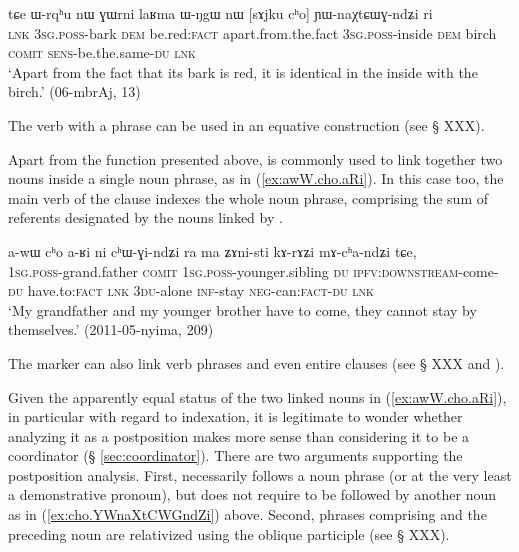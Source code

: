 \begin{exe}
\ex \label{ex:cho.YWnaXtCWGndZi}
\gll tɕe ɯ-rqʰu nɯ ɣɯrni laʁma ɯ-ŋgɯ nɯ [sɤjku cʰo] ɲɯ-naχtɕɯɣ-ndʑi ri\\
\textsc{lnk} \textsc{3sg}.\textsc{poss}-bark \textsc{dem} be.red:\textsc{fact} apart.from.the.fact \textsc{3sg}.\textsc{poss}-inside \textsc{dem} birch \textsc{comit} \textsc{sens}-be.the.same-\textsc{du} \textsc{lnk} \\
\glt `Apart from the fact that its bark is red, it is identical in the inside with the birch.' (06-mbrAj, 13)
\end{exe}

The verb  with a  phrase can be used in an equative construction (see § XXX).

 Apart from the function presented above,  is commonly used to link together two nouns inside a single noun phrase, as in (\ref{ex:awW.cho.aRi}). In this case too, the main verb of the clause indexes the whole noun phrase, comprising the sum of referents designated by the nouns linked by .

\begin{exe}
\ex \label{ex:awW.cho.aRi}
\gll a-wɯ cʰo a-ʁi ni cʰɯ-ɣi-ndʑi ra ma ʑɤni-sti kɤ-rɤʑi mɤ-cʰa-ndʑi tɕe, \\
\textsc{1sg}.\textsc{poss}-grand.father \textsc{comit} \textsc{1sg}.\textsc{poss}-younger.sibling \textsc{du} \textsc{ipfv}:\textsc{downstream}-come-\textsc{du} have.to:\textsc{fact} \textsc{lnk} \textsc{3du}-alone \textsc{inf}-stay \textsc{neg}-can:\textsc{fact}-\textsc{du} \textsc{lnk} \\ 
\glt `My grandfather and my younger brother have to come, they cannot stay by themselves.' (2011-05-nyima, 209)
\end{exe}

The marker  can also link verb phrases and even entire clauses (see § XXX and \citealt[313]{jacques14linking}).

Given the apparently equal status of the two linked nouns in (\ref{ex:awW.cho.aRi}), in particular with regard to indexation, it is legitimate to wonder whether analyzing it as a postposition makes more sense than considering it to be a coordinator (§ \ref{sec:coordinator}). There are two arguments supporting the postposition analysis. First,  necessarily follows a noun phrase (or at the very least a demonstrative pronoun), but does not require to be followed by another noun as in (\ref{ex:cho.YWnaXtCWGndZi}) above. Second, phrases comprising  and the preceding noun are relativized using the oblique participle (see § XXX).

